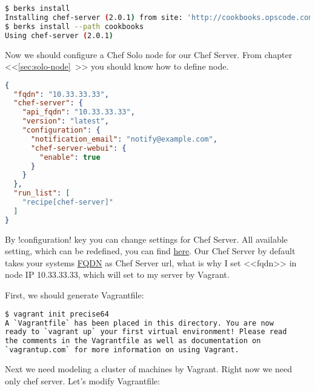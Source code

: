 \begin{lstlisting}[language=Bash,label=lst:my-server-cloud-installation3]
$ berks install
Installing chef-server (2.0.1) from site: 'http://cookbooks.opscode.com/api/v1/cookbooks'
$ berks install --path cookbooks
Using chef-server (2.0.1)
\end{lstlisting}

Now we should configure a Chef Solo node for our Chef Server. From chapter <<\ref{sec:solo-node}~>> you should know how to define node.

\begin{lstlisting}[language=JSON,label=lst:my-server-cloud-installation4,title=my-server-cloud/nodes/chef-server.example.com.json]
{
  "fqdn": "10.33.33.33",
  "chef-server": {
    "api_fqdn": "10.33.33.33",
    "version": "latest",
    "configuration": {
      "notification_email": "notify@example.com",
      "chef-server-webui": {
        "enable": true
      }
    }
  },
  "run_list": [
    "recipe[chef-server]"
  ]
}
\end{lstlisting}

By \inline!configuration! key you can change settings for Chef Server. All available setting, which can be redefined, you can find \href{https://github.com/opscode/omnibus-chef-server/blob/master/files/chef-server-cookbooks/chef-server/attributes/default.rb}{here}. Our Chef Server by default takes your systems \href{http://en.wikipedia.org/wiki/Fully\_qualified\_domain\_name}{FQDN} as Chef Server url, what is why I set <<fqdn>> in node IP 10.33.33.33, which will set to my server by Vagrant.

First, we should generate Vagrantfile:

\begin{lstlisting}[language=Bash,label=lst:my-server-cloud-installation5]
$ vagrant init precise64
A `Vagrantfile` has been placed in this directory. You are now
ready to `vagrant up` your first virtual environment! Please read
the comments in the Vagrantfile as well as documentation on
`vagrantup.com` for more information on using Vagrant.
\end{lstlisting}

Next we need modeling a cluster of machines by Vagrant. Right now we need only chef server. Let's modify Vagrantfile:

